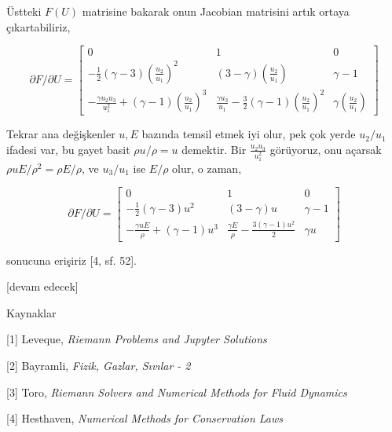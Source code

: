 \documentclass[12pt,fleqn]{article}\usepackage{../../common}
\begin{document}
Üstteki $F(U)$ matrisine bakarak onun Jacobian matrisini artık ortaya çıkartabiliriz,

$$
\partial F / \partial U =
\left[\begin{array}{ccc}
0 &
1 &
0 \\
-\frac{1}{2} (\gamma - 3)(\frac{u_2}{u_1})^2 &
(3-\gamma)(\frac{u_2}{u_1}) &
\gamma-1
\\
- \frac{\gamma u_2 u_3}{u_1^2} + (\gamma-1)(\frac{u_2}{u_1})^3 &
\frac{\gamma u_3}{u_1} - \frac{3}{2} (\gamma-1)(\frac{u_2}{u_1})^2 &
\gamma (\frac{u_2}{u_1})
\end{array}\right]
$$

Tekrar ana değişkenler $u,E$ bazında temsil etmek iyi olur, pek çok yerde
$u_2/u_1$ ifadesi var, bu gayet basit $\rho u / \rho = u$ demektir. Bir
$\frac{u_2 u_3}{u_1^2}$ görüyoruz, onu açarsak $\rho u E / \rho^2 = \rho E / \rho$,
ve $u_3 / u_1$ ise $E / \rho$ olur, o zaman,

$$
\partial F / \partial U =
\left[\begin{array}{ccc}
0 &
1 &
0 \\
-\frac{1}{2} (\gamma - 3)u^2 &
(3-\gamma)u &
\gamma-1
\\
- \frac{\gamma u E}{\rho} + (\gamma-1)u^3 &
\frac{\gamma E}{\rho} - \frac{3 (\gamma-1)u^2}{2} &
\gamma u
\end{array}\right]
$$

sonucuna erişiriz [4, sf. 52].











[devam edecek]


Kaynaklar

[1] Leveque, {\em Riemann Problems and Jupyter Solutions}

[2] Bayramli, {\em Fizik, Gazlar, Sıvılar - 2}

[3] Toro, {\em Riemann Solvers and Numerical Methods for Fluid Dynamics}

[4] Hesthaven, {\em Numerical Methods for Conservation Laws}
\end{document}
